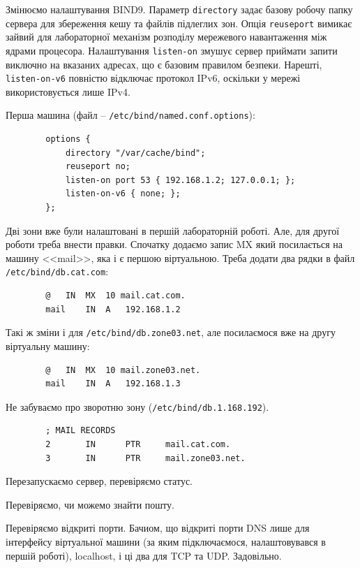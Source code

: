 \documentclass[14pt, a4paper]{extreport}
\begin{document}
	
	Змінюємо налаштування BIND9. Параметр \texttt{directory} задає базову робочу папку сервера для збереження кешу та файлів підлеглих зон. Опція \texttt{reuseport} вимикає зайвий для лабораторної механізм розподілу мережевого навантаження між ядрами процесора. Налаштування \texttt{listen-on} змушує сервер приймати запити виключно на вказаних адресах, що є базовим правилом безпеки. Нарешті, \texttt{listen-on-v6} повністю відключає протокол IPv6, оскільки у мережі використовується лише IPv4.
	
	Перша машина (файл -- \texttt{/etc/bind/named.conf.options}):
	
	\begin{verbatim}
		options {
			directory "/var/cache/bind";
			reuseport no;
			listen-on port 53 { 192.168.1.2; 127.0.0.1; };
			listen-on-v6 { none; };
		};
	\end{verbatim}
	
	Дві зони вже були налаштовані в першій лабораторній роботі. Але, для другої роботи треба внести правки. Спочатку додаємо запис MX який посилається на машину <<mail>>, яка і є першою віртуальною. Треба додати два рядки в файл \texttt{/etc/bind/db.cat.com}:
	
	\begin{verbatim}
		@	IN	MX	10 mail.cat.com.
		mail	IN	A	192.168.1.2
	\end{verbatim}
	
	Такі ж зміни і для \texttt{/etc/bind/db.zone03.net}, але посилаємося вже на другу віртуальну машину:
	
	\begin{verbatim}
		@	IN	MX	10 mail.zone03.net.
		mail	IN	A	192.168.1.3
	\end{verbatim}
	
	Не забуваємо про зворотню зону (\texttt{/etc/bind/db.1.168.192}).
	
	\begin{verbatim}
		; MAIL RECORDS
		2       IN      PTR     mail.cat.com.
		3       IN      PTR     mail.zone03.net.
	\end{verbatim}
	
	Перезапускаємо сервер, перевіряємо статус.
	
	
	Перевіряємо, чи можемо знайти пошту.
	
	
	Перевіряємо відкриті порти. Бачиом, що відкриті порти DNS лише для інтерфейсу віртуальної машини (за яким підключаємося, налаштовувався в першій роботі), localhost, і ці два для TCP та UDP. Задовільно.
	
\end{document}
